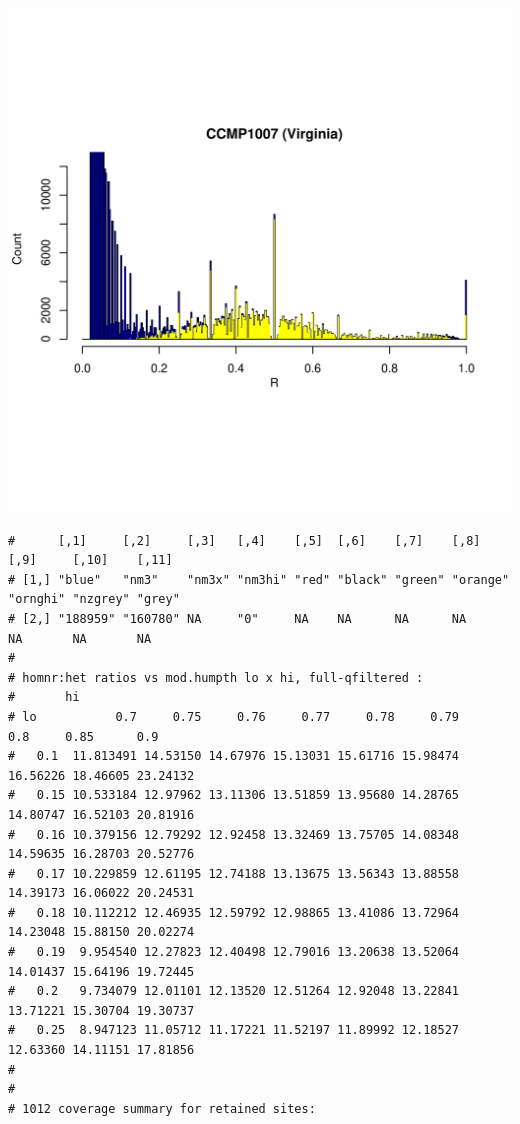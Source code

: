 \documentclass{article}\usepackage[]{graphicx}\usepackage[]{color}
\makeatletter
\def\maxwidth{ %
  \ifdim\Gin@nat@width>\linewidth
    \linewidth
  \else
    \Gin@nat@width
  \fi
}
\newenvironment{kframe}{%
 \def\at@end@of@kframe{}%
 \ifinner\ifhmode%
  \def\at@end@of@kframe{\end{minipage}}%
  \begin{minipage}{\columnwidth}%
 \fi\fi%
 \def\FrameCommand##1{\hskip\@totalleftmargin \hskip-\fboxsep
 \colorbox{shadecolor}{##1}\hskip-\fboxsep
     \hskip-\linewidth \hskip-\@totalleftmargin \hskip\columnwidth}%
 \MakeFramed {\advance\hsize-\width
   \@totalleftmargin\z@ \linewidth\hsize
   \@setminipage}}%
 {\par\unskip\endMakeFramed%
 \at@end@of@kframe}
\newenvironment{knitrout}{}{} %
\makeatother
\begin{document}
\begin{knitrout}
\includegraphics[width=\maxwidth]{FigS7-hwe-histo-figs-knitr/unnamed-chunk-10-29} 
\begin{kframe}\begin{verbatim}
#      [,1]     [,2]     [,3]   [,4]    [,5]  [,6]    [,7]    [,8]     [,9]     [,10]    [,11] 
# [1,] "blue"   "nm3"    "nm3x" "nm3hi" "red" "black" "green" "orange" "ornghi" "nzgrey" "grey"
# [2,] "188959" "160780" NA     "0"     NA    NA      NA      NA       NA       NA       NA
# 
# homnr:het ratios vs mod.humpth lo x hi, full-qfiltered :
#       hi
# lo           0.7     0.75     0.76     0.77     0.78     0.79      0.8     0.85      0.9
#   0.1  11.813491 14.53150 14.67976 15.13031 15.61716 15.98474 16.56226 18.46605 23.24132
#   0.15 10.533184 12.97962 13.11306 13.51859 13.95680 14.28765 14.80747 16.52103 20.81916
#   0.16 10.379156 12.79292 12.92458 13.32469 13.75705 14.08348 14.59635 16.28703 20.52776
#   0.17 10.229859 12.61195 12.74188 13.13675 13.56343 13.88558 14.39173 16.06022 20.24531
#   0.18 10.112212 12.46935 12.59792 12.98865 13.41086 13.72964 14.23048 15.88150 20.02274
#   0.19  9.954540 12.27823 12.40498 12.79016 13.20638 13.52064 14.01437 15.64196 19.72445
#   0.2   9.734079 12.01101 12.13520 12.51264 12.92048 13.22841 13.71221 15.30704 19.30737
#   0.25  8.947123 11.05712 11.17221 11.52197 11.89992 12.18527 12.63360 14.11151 17.81856
# 
# 
# 1012 coverage summary for retained sites:

\end{verbatim}
\end{kframe}
\end{knitrout}
\end{document}
